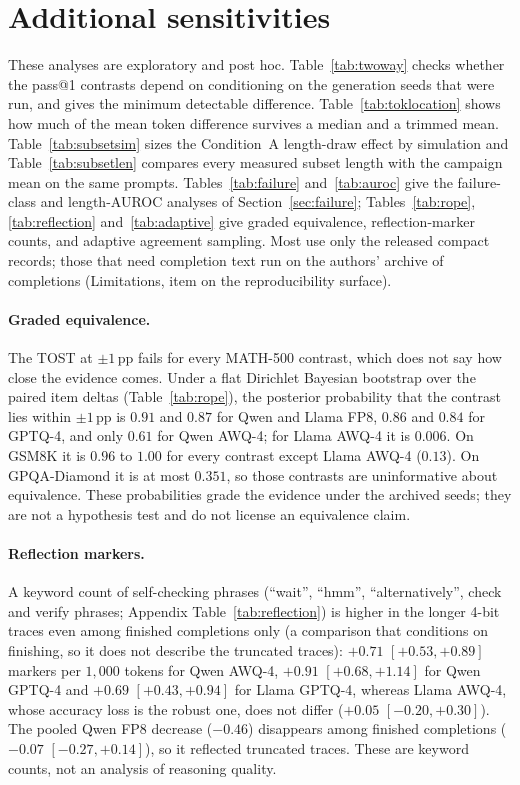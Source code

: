 \documentclass[11pt,a4paper]{article}
\begin{document}
\section{Additional sensitivities}
\label{app:additions}
These analyses are exploratory and post hoc. Table~\ref{tab:twoway} checks whether the pass@1 contrasts depend on conditioning on the generation seeds that were run, and gives the minimum detectable difference. Table~\ref{tab:toklocation} shows how much of the mean token difference survives a median and a trimmed mean. Table~\ref{tab:subsetsim} sizes the Condition~A length-draw effect by simulation and Table~\ref{tab:subsetlen} compares every measured subset length with the campaign mean on the same prompts. Tables~\ref{tab:failure} and~\ref{tab:auroc} give the failure-class and length-AUROC analyses of Section~\ref{sec:failure}; Tables~\ref{tab:rope}, \ref{tab:reflection} and~\ref{tab:adaptive} give graded equivalence, reflection-marker counts, and adaptive agreement sampling. Most use only the released compact records; those that need completion text run on the authors' archive of completions (Limitations, item on the reproducibility surface).

\paragraph{Graded equivalence.} The TOST at $\pm 1$\,pp fails for every MATH-500 contrast, which does not say how close the evidence comes. Under a flat Dirichlet Bayesian bootstrap over the paired item deltas (Table~\ref{tab:rope}), the posterior probability that the contrast lies within $\pm 1$\,pp is $0.91$ and $0.87$ for Qwen and Llama FP8, $0.86$ and $0.84$ for GPTQ-4, and only $0.61$ for Qwen AWQ-4; for Llama AWQ-4 it is $0.006$. On GSM8K it is $0.96$ to $1.00$ for every contrast except Llama AWQ-4 ($0.13$). On GPQA-Diamond it is at most $0.351$, so those contrasts are uninformative about equivalence. These probabilities grade the evidence under the archived seeds; they are not a hypothesis test and do not license an equivalence claim.

\paragraph{Reflection markers.} A keyword count of self-checking phrases (``wait'', ``hmm'', ``alternatively'', check and verify phrases; Appendix Table~\ref{tab:reflection}) is higher in the longer 4-bit traces even among finished completions only (a comparison that conditions on finishing, so it does not describe the truncated traces): $+0.71$ $[+0.53,+0.89]$ markers per $1{,}000$ tokens for Qwen AWQ-4, $+0.91$ $[+0.68,+1.14]$ for Qwen GPTQ-4 and $+0.69$ $[+0.43,+0.94]$ for Llama GPTQ-4, whereas Llama AWQ-4, whose accuracy loss is the robust one, does not differ ($+0.05$ $[-0.20,+0.30]$). The pooled Qwen FP8 decrease ($-0.46$) disappears among finished completions ($-0.07$ $[-0.27,+0.14]$), so it reflected truncated traces. These are keyword counts, not an analysis of reasoning quality.
\end{document}
